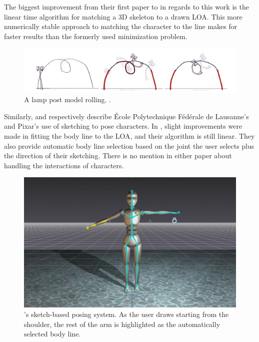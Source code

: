 The biggest improvement from their first paper to \citep{guay2015space} in regards to this work is the linear time algorithm for matching a 3D skeleton to a drawn LOA. This more numerically stable approach to matching the character to the line makes for faster results than the formerly used minimization problem.

\begin{figure}[!h]
\includegraphics[scale=0.4]{img/rolling}
\caption{A lamp post model rolling. \citep{guay2015space}.}
\end{figure}

Similarly, \citep{mahmudi2016artist} and \citep{stelzleni2015sketch} respectively describe \'Ecole Polytechnique F\'ed\'erale de Lausanne's and Pixar's use of sketching to pose characters. In \citep{mahmudi2016artist}, slight improvements were made in fitting the body line to the LOA, and their algorithm is still linear. They also provide automatic body line selection based on the joint the user selects plus the direction of their sketching. There is no mention in either paper about handling the interactions of characters. 

\begin{figure}[!h]
\centering
\includegraphics[scale=0.3]{img/epfl}
\caption{ \citep{mahmudi2016artist}'s sketch-based posing system. As the user draws starting from the shoulder, the rest of the arm is highlighted as the automatically selected body line.}
\end{figure}

